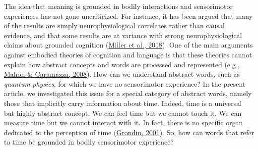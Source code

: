 \documentclass[
  a4paper,12pt,twoside,onecolumn,openright,final,oldfontcommands]{memoir}
\begin{document}
The idea that meaning is grounded in bodily interactions and sensorimotor experiences has not gone uncriticized. For instance, it has been argued that many of the results are simply neurophysiological correlates rather than causal evidence, and that some results are at variance with strong neurophysiological claims about grounded cognition (\protect\hyperlink{ref-miller_embodied_2018}{Miller et al., 2018}). One of the main arguments against embodied theories of cognition and language is that these theories cannot explain how abstract concepts and words are processed and represented (e.g., \protect\hyperlink{ref-mahon_critical_2008}{Mahon \& Caramazza, 2008}). How can we understand abstract words, such as \emph{quantum} \emph{physics}, for which we have no sensorimotor experience? In the present article, we investigated this issue for a special category of abstract words, namely those that implicitly carry information about time. Indeed, time is a universal but highly abstract concept. We can feel time but we cannot touch it. We can measure time but we cannot interact with it. In fact, there is no specific organ dedicated to the perception of time (\protect\hyperlink{ref-grondin_physical_2001}{Grondin, 2001}). So, how can words that refer to time be grounded in bodily sensorimotor experience?
\end{document}
